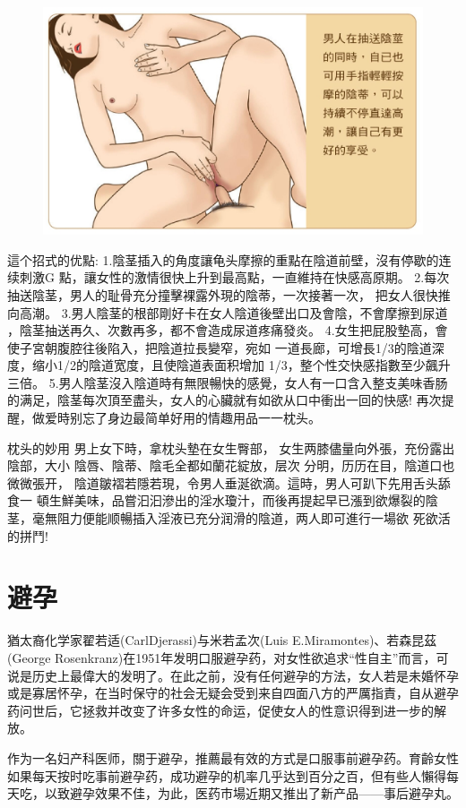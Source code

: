 \documentclass[12pt,UTF8]{ctexbook}
\begin{document}
\begin{figure}[htbp]
	\centering
	\includegraphics[width=0.7\linewidth]{31}
	\caption{}
	\label{fig:1}
\end{figure}

這个招式的优點:
1.陰茎插入的角度讓龟头摩擦的重點在陰道前壁，沒有停歇的连续刺激G
點，讓女性的激情很快上升到最高點，一直維持在快感高原期。
2.每次抽送陰茎，男人的耻骨充分撞擊裸露外現的陰蒂，一次接著一次，
把女人很快推向高潮。
3.男人陰茎的根部剛好卡在女人陰道後壁出口及會陰，不會摩擦到尿道
，陰茎抽送再久、次數再多，都不會造成尿道疼痛發炎。
4.女生把屁股墊高，會使子宮朝腹腔往後陷入，把陰道拉長變窄，宛如
一道長廊，可增長1/3的陰道深度，缩小1/2的陰道宽度，且使陰道表面积增加
1/3，整个性交快感指數至少飆升三倍。
5.男人陰茎沒入陰道時有無限暢快的感覺，女人有一口含入整支美味香肠
的满足，陰茎每次頂至盡头，女人的心臟就有如欲从口中衝出一回的快感!
再次提醒，做爱時别忘了身边最简单好用的情趣用品一一枕头。

枕头的妙用
男上女下時，拿枕头墊在女生臀部，
女生两膝儘量向外張，充份露出陰部，大小
陰唇、陰蒂、陰毛全都如蘭花綻放，层次
分明，历历在目，陰道口也微微張开，
陰道皺褶若隱若現，令男人垂涎欲滴。這時，男人可趴下先用舌头舔食一
頓生鮮美味，品嘗汩汩滲出的淫水瓊汁，而後再提起早已漲到欲爆裂的陰
茎，毫無阻力便能顺暢插入淫液已充分润滑的陰道，两人即可進行一場欲
死欲活的拼鬥!



\chapter{避孕}

猶太裔化学家翟若适(CarlDjerassi)与米若孟次(Luis E.Miramontes)、若森昆茲(George Rosenkranz)在1951年发明口服避孕药，对女性欲追求“性自主”而言，可说是历史上最偉大的发明了。在此之前，没有任何避孕的方法，女人若是未婚怀孕或是寡居怀孕，在当时保守的社会无疑会受到来自四面八方的严厲指責，自从避孕药问世后，它拯救并改变了许多女性的命运，促使女人的性意识得到进一步的解放。

作为一名妇产科医师，關于避孕，推薦最有效的方式是口服事前避孕药。育齡女性如果每天按时吃事前避孕药，成功避孕的机率几乎达到百分之百，但有些人懶得每天吃，以致避孕效果不佳，为此，医药市場近期又推出了新产品——事后避孕丸。
\end{document}

